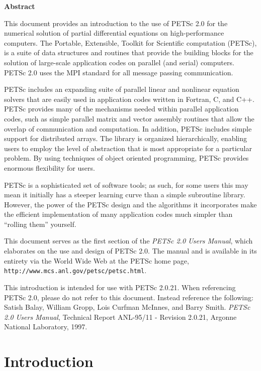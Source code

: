 \vspace{1.0cm}

\begin{center} {\bf Abstract} \end{center}

This document provides an introduction to
the use of PETSc 2.0 for the numerical solution
of partial differential equations on high-performance computers.  The
Portable, Extensible, Toolkit for Scientific computation (PETSc), is a
suite of data structures and routines that provide the building
blocks for the solution of large-scale application codes on parallel
(and serial) computers.  PETSc 2.0 uses the MPI standard for all
message passing communication.

PETSc includes an expanding suite of parallel linear and nonlinear
equation solvers that are easily used in application codes written in
Fortran, C, and C++.  PETSc provides many of the mechanisms needed
within parallel application codes, such as simple parallel matrix and
vector assembly routines that allow the overlap of communication and
computation.  In addition, PETSc includes simple support for
distributed arrays.  The library is organized
hierarchically, enabling users to employ the level of abstraction that
is most appropriate for a particular problem. By using techniques 
of object oriented programming, PETSc provides enormous flexibility 
for users.

PETSc is a sophisticated set of software tools; as such, for some
users this may mean it initially has a steeper learning curve than a
simple subroutine library. However, the power of the PETSc design and
the algorithms it incorporates make the efficient implementation of
many application codes much simpler than ``rolling them'' yourself.

This document serves as the first section of the {\em PETSc 2.0 Users
Manual}, which elaborates on the use and design of PETSc 2.0. The
manual and is available in its entirety via the World Wide Web at
the PETSc home page, {\tt http://www.mcs.anl.gov/petsc/petsc.html}.

\vspace{1.2cm}

 This introduction is intended for use with
PETSc 2.0.21. When referencing PETSc 2.0, please do 
not refer to this document. Instead reference the following: Satish
Balay, William Gropp, Lois Curfman McInnes, and Barry Smith.  {\em
PETSc 2.0 Users Manual}, Technical Report ANL-95/11 - Revision 2.0.21,
Argonne National Laboratory, 1997.

%
\newpage


\newpage
\section{Introduction}


